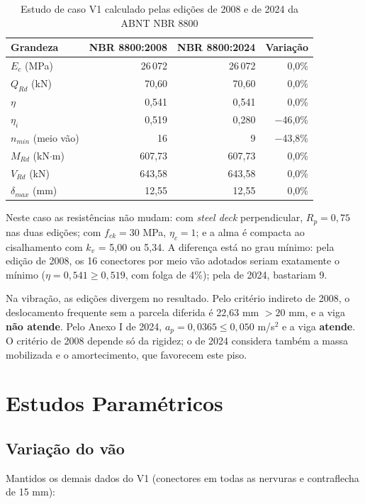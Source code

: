 \begin{table}[htbp]
  \centering
  \caption{Estudo de caso V1 calculado pelas edições de 2008 e de 2024 da ABNT NBR 8800}\label{tab:v1-edicoes}
  {
  \begin{tabular}{lrrr}
  \toprule
  Grandeza & NBR 8800:2008 & NBR 8800:2024 & Variação \\
  \midrule
  $E_c$ (MPa) & 26\,072 & 26\,072 & 0,0\% \\
  $Q_{Rd}$ (kN) & 70,60 & 70,60 & 0,0\% \\
  $\eta$ & 0,541 & 0,541 & 0,0\% \\
  $\eta_i$ & 0,519 & 0,280 & \ensuremath{-}46,0\% \\
  $n_{min}$ (meio vão) & 16 & 9 & \ensuremath{-}43,8\% \\
  $M_{Rd}$ (kN\ensuremath{\cdot}m) & 607,73 & 607,73 & 0,0\% \\
  $V_{Rd}$ (kN) & 643,58 & 643,58 & 0,0\% \\
  $\delta_{max}$ (mm) & 12,55 & 12,55 & 0,0\% \\
  \bottomrule
  \end{tabular}
  }
\end{table}

Neste caso as resistências não mudam: com \emph{steel deck} perpendicular, $R_p = 0{,}75$ nas duas edições; com $f_{ck} = 30$ MPa, $\eta_c = 1$; e a alma é compacta ao cisalhamento com $k_v$ = 5,00 ou 5,34. A diferença está no grau mínimo: pela edição de 2008, os 16 conectores por meio vão adotados seriam exatamente o mínimo ($\eta = 0{,}541 \ge 0{,}519$, com folga de 4\%); pela de 2024, bastariam 9.

Na vibração, as edições divergem no resultado. Pelo critério indireto de 2008, o deslocamento frequente sem a parcela diferida é 22,63 mm $> 20$ mm, e a viga \textbf{não atende}. Pelo Anexo I de 2024, $a_p = 0{,}0365 \le 0{,}050$ m/s\ensuremath{^2} e a viga \textbf{atende}. O critério de 2008 depende só da rigidez; o de 2024 considera também a massa mobilizada e o amortecimento, que favorecem este piso.

\section{Estudos Paramétricos}\label{sec:4.5}

\subsection{Variação do vão}\label{sec:4.5.1}
Mantidos os demais dados do V1 (conectores em todas as nervuras e contraflecha de 15 mm):

